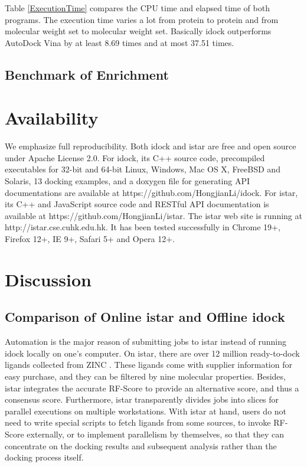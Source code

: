 \documentclass[10pt]{article}
\begin{document}
Table \ref{ExecutionTime} compares the CPU time and elapsed time of both programs. The execution time varies a lot from protein to protein and from molecular weight set to molecular weight set. Basically idock outperforms AutoDock Vina by at least 8.69 times and at most 37.51 times.

\subsection*{Benchmark of Enrichment}


\section*{Availability}
We emphasize full reproducibility. Both idock and istar are free and open source under Apache License 2.0. For idock, its C++ source code, precompiled executables for 32-bit and 64-bit Linux, Windows, Mac OS X, FreeBSD and Solaris, 13 docking examples, and a doxygen file for generating API documentations are available at https://github.com/HongjianLi/idock. For istar, its C++ and JavaScript source code and RESTful API documentation is available at https://github.com/HongjianLi/istar. The istar web site is running at http://istar.cse.cuhk.edu.hk. It has been tested successfully in Chrome 19+, Firefox 12+, IE 9+, Safari 5+ and Opera 12+.

\section*{Discussion}

\subsection*{Comparison of Online istar and Offline idock}
Automation is the major reason of submitting jobs to istar instead of running idock locally on one's computer. On istar, there are over 12 million ready-to-dock ligands collected from ZINC \cite{532,1178}. These ligands come with supplier information for easy purchase, and they can be filtered by nine molecular properties. Besides, istar integrates the accurate RF-Score to provide an alternative score, and thus a consensus score. Furthermore, istar transparently divides jobs into slices for parallel executions on multiple workstations. With istar at hand, users do not need to write special scripts to fetch ligands from some sources, to invoke RF-Score externally, or to implement parallelism by themselves, so that they can concentrate on the docking results and subsequent analysis rather than the docking process itself.
\end{document}
